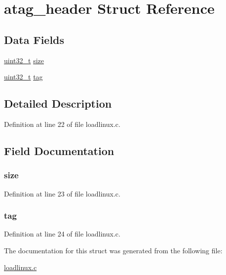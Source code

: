 \hypertarget{structatag__header}{\section{atag\-\_\-header \-Struct \-Reference}
\label{structatag__header}
}
\subsection*{\-Data \-Fields}
\begin{DoxyCompactItemize}
\item 
\hyperlink{arch__types_8h_a435d1572bf3f880d55459d9805097f62}{uint32\-\_\-t} \hyperlink{structatag__header_ab2c6b258f02add8fdf4cfc7c371dd772}{size}
\item 
\hyperlink{arch__types_8h_a435d1572bf3f880d55459d9805097f62}{uint32\-\_\-t} \hyperlink{structatag__header_a1c50fcd1195659821729f52af8f3bb7d}{tag}
\end{DoxyCompactItemize}


\subsection{\-Detailed \-Description}


\-Definition at line 22 of file loadlinux.\-c.



\subsection{\-Field \-Documentation}
\hypertarget{structatag__header_ab2c6b258f02add8fdf4cfc7c371dd772}{
\subsubsection[{size}]{ {\bf size}}}\label{structatag__header_ab2c6b258f02add8fdf4cfc7c371dd772}


\-Definition at line 23 of file loadlinux.\-c.

\hypertarget{structatag__header_a1c50fcd1195659821729f52af8f3bb7d}{
\subsubsection[{tag}]{ {\bf tag}}}\label{structatag__header_a1c50fcd1195659821729f52af8f3bb7d}


\-Definition at line 24 of file loadlinux.\-c.



\-The documentation for this struct was generated from the following file\-:\begin{DoxyCompactItemize}
\item 
\hyperlink{loadlinux_8c}{loadlinux.\-c}\end{DoxyCompactItemize}
